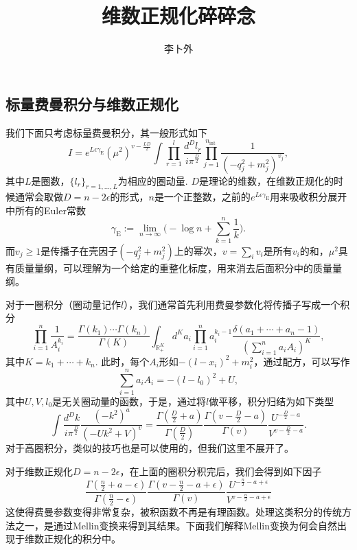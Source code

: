 \documentclass[11pt]{article}
\title{维数正规化碎碎念}
\author{李卜外}
\theoremstyle{definition}
\theoremstyle{plain}
\begin{document}
\maketitle

\subsection{标量费曼积分与维数正规化}

我们下面只考虑标量费曼积分，其一般形式如下
\[
	I=e^{L\epsilon \gamma_{\mathrm{E}}}\left(\mu^{2}\right)^{v-\frac{L D}{2}} \int \prod_{r=1}^{l} \frac{d^{D} l_{r}}{i \pi^{\frac{D}{2}}} \prod_{j=1}^{n_{\text {int }}} \frac{1}{\left(-q_{j}^{2}+m_{j}^{2}\right)^{v_{j}}},
\]
其中$L$是圈数，$\{l_r\}_{r=1,\dots,L}$为相应的圈动量. $D$是理论的维数，在维数正规化的时候通常会取做$D=n-2\epsilon$的形式，$n$是一个正整数，之前的$e^{L\epsilon \gamma_{\mathrm{E}}}$用来吸收积分展开中所有的Euler常数
\[
	\gamma_{\mathrm{E}}:=\lim_{n\to \infty}\biggl(-\log n+\sum_{k=1}^n\frac{1}{k}\biggr).
\]
而$v_j\geq 1$是传播子在壳因子$(-q_{j}^{2}+m_{j}^{2})$上的幂次，$v=\sum_i v_i$是所有$v_i$的和，$\mu^{2}$具有质量量纲，可以理解为一个给定的重整化标度，用来消去后面积分中的质量量纲。

对于一圈积分（圈动量记作$l$），我们通常首先利用费曼参数化将传播子写成一个积分
\[
	\prod_{i=1}^n\frac{1}{A_i^{k_i}}=\frac{\Gamma(k_1)\cdots \Gamma(k_n)}{\Gamma(K)}\int_{\mathbb R^K_+}d^K a_i \prod_{i=1}^n a_i^{k_i-1}\frac{\delta(a_1+\cdots+a_n-1)}{(\sum_{i=1}^n a_iA_i)^K},
\]
其中$K=k_1+\cdots+k_n$. 此时，每个$A_i$形如$-(l-x_i)^2+m_i^2$，通过配方，可以写作
\[
	\sum_{i=1}^n a_iA_i= -(l-l_0)^2+U,
\]
其中$U,V,l_0$是无关圈动量的函数，于是，通过将$l$做平移，积分归结为如下类型
\[
	\int \frac{d^{D} k}{i \pi^{\frac{D}{2}}} \frac{\left(-k^{2}\right)^{a}}{\left(-U k^{2}+V\right)^{v}}=\frac{\Gamma\left(\frac{D}{2}+a\right)}{\Gamma\left(\frac{D}{2}\right)} \frac{\Gamma\left(v-\frac{D}{2}-a\right)}{\Gamma(v)} \frac{U^{-\frac{D}{2}-a}}{V^{v-\frac{D}{2}-a}}.
\]
对于高圈积分，类似的技巧也是可以使用的，但我们这里不展开了。

对于维数正规化$D=n-2\epsilon$，在上面的圈积分积完后，我们会得到如下因子
\[
	\frac{\Gamma\left(\frac{n}{2}+a-\epsilon\right)}{\Gamma\left(\frac{n}{2}-\epsilon\right)} \frac{\Gamma\left(v-\frac{n}{2}-a+\epsilon\right)}{\Gamma(v)} \frac{U^{-\frac{n}{2}-a+\epsilon}}{V^{v-\frac{n}{2}-a+\epsilon}}
\]
这使得费曼参数变得非常复杂，被积函数不再是有理函数。处理这类积分的传统方法之一，是通过Mellin变换来得到其结果。下面我们解释Mellin变换为何会自然出现于维数正规化的积分中。
\end{document}
